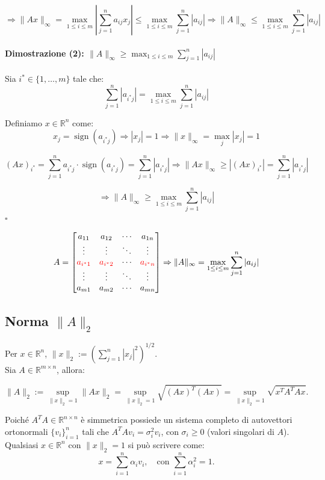 \documentclass[12pt,a4paper]{article}
\begin{document}
\[
\Rightarrow \|Ax\|_\infty = \max_{1 \le i \le m} \left| \sum_{j=1}^n a_{ij} x_j \right| \le \max_{1 \le i \le m} \sum_{j=1}^n |a_{ij}|
\Rightarrow \|A\|_\infty \le \max_{1 \le i \le m} \sum_{j=1}^n |a_{ij}|
\]

\paragraph{Dimostrazione (2): $\|A\|_\infty \ge \max_{1 \le i \le m} \sum_{j=1}^n |a_{ij}|$}

Sia $i^* \in \{1, \dots, m\}$ tale che:
\[
\sum_{j=1}^n |a_{i^* j}| = \max_{1 \le i \le m} \sum_{j=1}^n |a_{ij}|
\]

Definiamo $x \in \mathbb{R}^n$ come:
\[
x_j = \operatorname{sign}(a_{i^* j}) \Rightarrow |x_j| = 1
\Rightarrow \|x\|_\infty = \max_j |x_j| = 1
\]

\[
(Ax)_{i^*} = \sum_{j=1}^n a_{i^* j} \cdot \operatorname{sign}(a_{i^* j}) = \sum_{j=1}^n |a_{i^* j}|
\Rightarrow \|Ax\|_\infty \ge |(Ax)_{i^*}| = \sum_{j=1}^n |a_{i^* j}|
\]

\[
\Rightarrow \|A\|_\infty \ge \max_{1 \le i \le m} \sum_{j=1}^n |a_{ij}|
\]
\hfill $\square$

\[
A =
\begin{bmatrix}
a_{11} & a_{12} & \cdots & a_{1n} \\
\vdots & \vdots & \ddots & \vdots \\
\color{red}{a_{i^*1}} & \color{red}{a_{i^*2}} & \cdots & \color{red}{a_{i^*n}} \\
\vdots & \vdots & \ddots & \vdots \\
a_{m1} & a_{m2} & \cdots & a_{mn}
\end{bmatrix}
\Rightarrow \|A\|_\infty = \max_{1 \le i \le m} \sum_{j=1}^n |a_{ij}|
\]


\subsection*{Norma $\|A\|_2$}

Per $x \in \mathbb{R}^n$, $\|x\|_2 := \left( \sum_{j=1}^n |x_j|^2 \right)^{1/2}$.\\
Sia $A \in \mathbb{R}^{m \times n}$, allora:

\[
\|A\|_2 := \sup_{\|x\|_2 = 1} \|Ax\|_2 = \sup_{\|x\|_2 = 1} \sqrt{(Ax)^T (Ax)} = \sup_{\|x\|_2 = 1} \sqrt{x^T A^T A x}.
\]

Poiché $A^T A \in \mathbb{R}^{n \times n}$ è simmetrica possiede un sistema completo di autovettori ortonormali $\{v_i\}_{i=1}^n$ tali che $A^T A v_i = \sigma_i^2 v_i$, con $\sigma_i \geq 0$ (valori singolari di $A$).\\
Qualsiasi $x \in \mathbb{R}^n$ con $\|x\|_2 = 1$ si può scrivere come:
\[
x = \sum_{i=1}^n \alpha_i v_i, \quad \text{con } \sum_{i=1}^n \alpha_i^2 = 1.
\]
\end{document}
